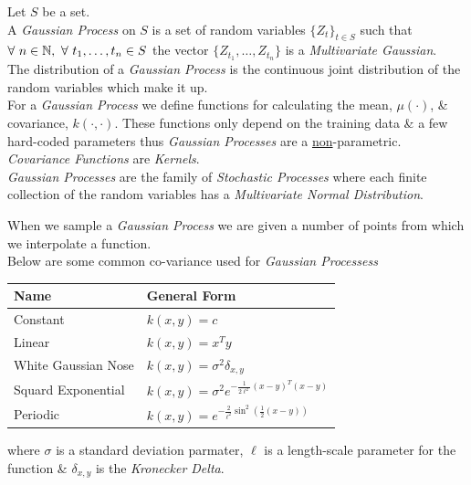 \documentclass[11pt,a4paper]{article}
\begin{document}
Let $S$ be a set.\\
A \textit{Gaussian Process} on $S$ is a set of random variables $\{Z_t\}_{t\in S}$ such that $\forall\ n\in\nats,\ \forall\ t_1,\dots,t_n\in S$ the vector $\{Z_{t_1},\dots,Z_{t_n}\}$ is a \textit{Multivariate Gaussian}.\\
The distribution of a \textit{Gaussian Process} is the continuous joint distribution of the random variables which make it up.\\
For a \textit{Gaussian Process} we define functions for calculating the mean, $\mu(\cdot)$, \& covariance, $k(\cdot,\cdot)$. These functions only depend on the training data \& a few hard-coded parameters thus \textit{Gaussian Processes} are a \underline{non}-parametric.\\
\nb \textit{Covariance Functions} are \textit{Kernels}.\\

\textit{Gaussian Processes} are the family of \textit{Stochastic Processes} where each finite collection of the random variables has a \textit{Multivariate Normal Distribution}.\\


When we sample a \textit{Gaussian Process} we are given a number of points from which we interpolate a function.\\

Below are some common co-variance used for \textit{Gaussian Processess}
\begin{center}\begin{tabular}{|l|l|}
\hline
\textbf{Name}&\textbf{General Form}\\
\hline
Constant&$k(x,y)=c$\\
Linear&$k(x,y)=x^Ty$\\
White Gaussian Nose&$k(x,y)=\sigma^2\delta_{x,y}$\\
Squard Exponential&$k(x,y)=\sigma^2e^{-\frac{1}{2\ell^2}(x-y)^T(x-y)}$\\
Periodic&$k(x,y)=e^{-\frac2{\ell^2}\sin^2\left(\frac{1}{2}(x-y)\right)}$\\
\hline
\end{tabular}\end{center}
where $\sigma$ is a standard deviation parmater, $\ell$ is a length-scale parameter for the function \& $\delta_{x,y}$ is the \textit{Kronecker Delta}.\\
\end{document}
